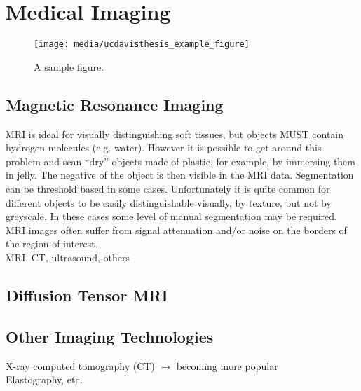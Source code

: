 \chapter{Medical Imaging}
%
\begin{figure}[tbh]
\centering
\texttt{[image: media/ucdavisthesis\_example\_figure]}
\caption[First sample figure]{A sample figure.}
\label{fig.sample_1}
\end{figure}

\section{Magnetic Resonance Imaging}
\label{Magnetic Resonance Imaging}

MRI is ideal for visually distinguishing soft tissues, but objects MUST contain hydrogen molecules (e.g. water). However it is possible to get around this problem and scan “dry” objects made of plastic, for example, by immersing them in jelly. The negative of the object is then visible in the MRI data. Segmentation can be threshold based in some cases. Unfortunately it is quite common for different objects to be easily distinguishable visually, by texture, but not by greyscale. In these cases some level of manual segmentation may be required. MRI images often suffer from signal attenuation and/or noise on the borders of the region of interest. \\

MRI, CT, ultrasound, others \\

\section{Diffusion Tensor MRI}
\label{Diffusion Tensor MRI}

\section{Other Imaging Technologies}
\label{Other Imaging Technologies}
X-ray computed tomography (CT) $\rightarrow$ becoming more popular \\
Elastography, etc.